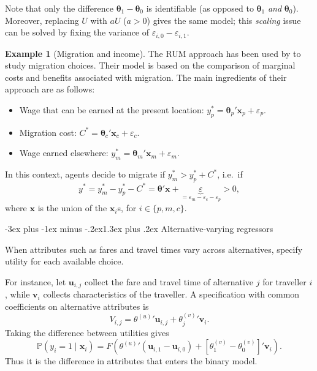 \documentclass[
  11pt,
]{book}
\makeatletter
\providecommand{\tightlist}{%
  \setlength{\itemsep}{0pt}\setlength{\parskip}{0pt}}
\renewcommand\section{\@startsection{section}{1}{\z@}
  {-3ex plus -1ex minus -.2ex}{1.3ex plus .2ex}
  {\normalfont\Large\bfseries\color{TextbookInk}}}
\theoremstyle{definition}
\theoremstyle{definition}
\newtheorem{example}{Example}[chapter]
\theoremstyle{definition}
\theoremstyle{definition}
\theoremstyle{remark}
\makeatother
\begin{document}
Note that only the difference \(\boldsymbol\theta_1-\boldsymbol\theta_0\) is identifiable (as opposed to \(\boldsymbol\theta_1\) \emph{and} \(\boldsymbol\theta_0\)). Moreover, replacing \(U\) with \(aU\) (\(a>0\)) gives the same model; this \emph{scaling} issue can be solved by fixing the variance of \(\varepsilon_{i,0}-\varepsilon_{i,1}\).

\begin{example}[Migration and income]
\protect\hypertarget{exm:migration}{}\label{exm:migration}The RUM approach has been used by \citet{Nakosteen_Zimmer_1980} to study migration choices. Their model is based on the comparison of marginal costs and benefits associated with migration. The main ingredients of their approach are as follows:

\begin{itemize}
\tightlist
\item
  Wage that can be earned at the present location: \(y_p^* = \boldsymbol\theta_p'\mathbf{x}_p + \varepsilon_p\).
\item
  Migration cost: \(C^*= \boldsymbol\theta_c'\mathbf{x}_c + \varepsilon_c\).
\item
  Wage earned elsewhere: \(y_m^* = \boldsymbol\theta_m'\mathbf{x}_m + \varepsilon_m\).
\end{itemize}

In this context, agents decide to migrate if \(y_m^* >  y_p^* + C^*\), i.e.~if
\[
y^* = y_m^* -  y_p^* - C^* =  \boldsymbol\theta'\mathbf{x} + \underbrace{\varepsilon}_{=\varepsilon_m - \varepsilon_c - \varepsilon_p}>0,
\]
where \(\mathbf{x}\) is the union of the \(\mathbf{x}_i\)s, for \(i \in \{p,m,c\}\).
\end{example}

\section{Alternative-varying regressors}\label{Avregressors}

When attributes such as fares and travel times vary across alternatives, specify utility for each available choice.

For instance, let \(\mathbf{u}_{i,j}\) collect the fare and travel time of alternative \(j\) for traveller \(i\), while \(\mathbf{v}_i\) collects characteristics of the traveller. A specification with common coefficients on alternative attributes is
\[
V_{i,j}={\theta^{(u)}}'\mathbf{u}_{i,j}+{\theta_j^{(v)}}'\mathbf{v}_i.
\]
Taking the difference between utilities gives
\begin{equation}
\mathbb{P}(y_i=1\mid\mathbf{x}_i)=F\left({\theta^{(u)}}'(\mathbf{u}_{i,1}-\mathbf{u}_{i,0})+
[\theta_1^{(v)}-\theta_0^{(v)}]'\mathbf{v}_i\right). \label{eq:utility3}
\end{equation}
Thus it is the difference in attributes that enters the binary model.
\end{document}
